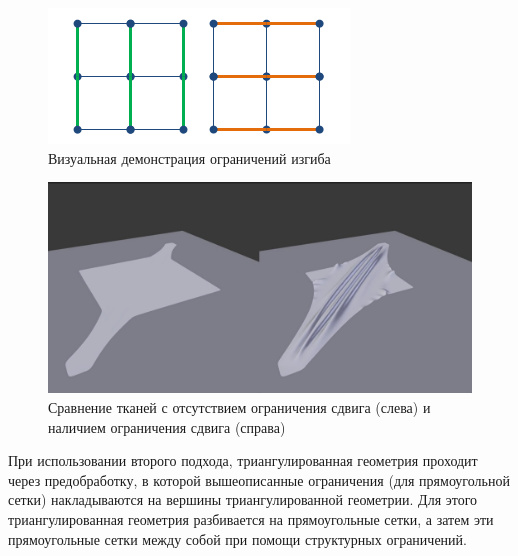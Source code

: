 	\begin{figure}[ht!] 
		\center
		\includegraphics [scale=1] {my_folder/images//bending}
		\caption{Визуальная демонстрация ограничений изгиба}
		\label{fig:bending}  
	\end{figure}
	
	\begin{figure}[ht!] 
		\center
		\includegraphics [scale=0.3] {my_folder/images//shear_blender}
		\caption{Сравнение тканей с отсутствием ограничения сдвига (слева) и наличием ограничения сдвига (справа)}
		\label{fig:shear_blender}  
	\end{figure}

	При использовании второго подхода, триангулированная геометрия проходит через предобработку, в которой вышеописанные ограничения (для прямоугольной сетки) накладываются на вершины триангулированной геометрии. Для этого триангулированная геометрия разбивается на прямоугольные сетки, а затем эти прямоугольные сетки  между собой при помощи структурных ограничений.
	
%
